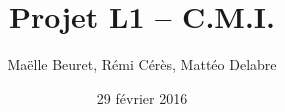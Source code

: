 \documentclass{report}
\begin{document}
\title{Projet L1 -- C.M.I.}
\date{29 février 2016}
\author{Maëlle Beuret, Rémi Cérès, Mattéo Delabre}
\maketitle

\setcounter{tocdepth}{1}
\tableofcontents

\setlength{\parskip}{0.4cm plus4mm minus3mm}








\cleardoublepage
{}
{}


\end{document}
